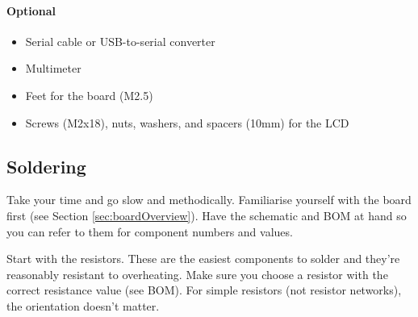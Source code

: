 \documentclass{article}
\begin{document}
\paragraph{Optional}
\begin{itemize}
\item[\CheckBox{}] Serial cable or USB-to-serial converter
\item[\CheckBox{}] Multimeter
\item[\CheckBox{}] Feet for the board (M2.5)
\item[\CheckBox{}] Screws (M2x18), nuts, washers, and spacers (10mm) for the LCD
\end{itemize}

\subsection{Soldering}
Take your time and go slow and methodically. Familiarise yourself with the board first (see Section \ref{sec:boardOverview}). Have the schematic and BOM at hand so you can refer to them for component numbers and values. 

Start with the resistors. These are the easiest components to solder and they're reasonably resistant to overheating. Make sure you choose a resistor with the correct resistance value (see BOM). For simple resistors (not resistor networks), the orientation doesn't matter. 
\end{document}
